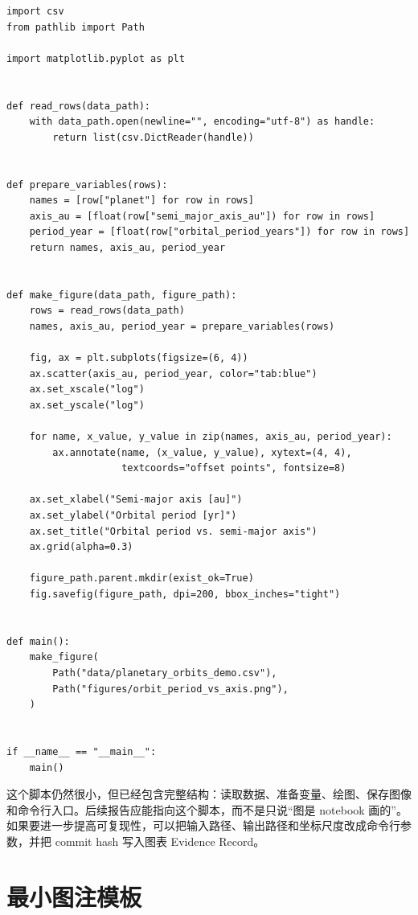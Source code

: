 \begin{examplebox}[绘图脚本骨架]
\begin{lstlisting}[style=pythonstyle]
import csv
from pathlib import Path

import matplotlib.pyplot as plt


def read_rows(data_path):
    with data_path.open(newline="", encoding="utf-8") as handle:
        return list(csv.DictReader(handle))


def prepare_variables(rows):
    names = [row["planet"] for row in rows]
    axis_au = [float(row["semi_major_axis_au"]) for row in rows]
    period_year = [float(row["orbital_period_years"]) for row in rows]
    return names, axis_au, period_year


def make_figure(data_path, figure_path):
    rows = read_rows(data_path)
    names, axis_au, period_year = prepare_variables(rows)

    fig, ax = plt.subplots(figsize=(6, 4))
    ax.scatter(axis_au, period_year, color="tab:blue")
    ax.set_xscale("log")
    ax.set_yscale("log")

    for name, x_value, y_value in zip(names, axis_au, period_year):
        ax.annotate(name, (x_value, y_value), xytext=(4, 4),
                    textcoords="offset points", fontsize=8)

    ax.set_xlabel("Semi-major axis [au]")
    ax.set_ylabel("Orbital period [yr]")
    ax.set_title("Orbital period vs. semi-major axis")
    ax.grid(alpha=0.3)

    figure_path.parent.mkdir(exist_ok=True)
    fig.savefig(figure_path, dpi=200, bbox_inches="tight")


def main():
    make_figure(
        Path("data/planetary_orbits_demo.csv"),
        Path("figures/orbit_period_vs_axis.png"),
    )


if __name__ == "__main__":
    main()
\end{lstlisting}
\end{examplebox}

这个脚本仍然很小，但已经包含完整结构：读取数据、准备变量、绘图、保存图像和命令行入口。后续报告应能指向这个脚本，而不是只说“图是 notebook 画的”。如果要进一步提高可复现性，可以把输入路径、输出路径和坐标尺度改成命令行参数，并把 commit hash 写入图表 Evidence Record。

\section{最小图注模板}

